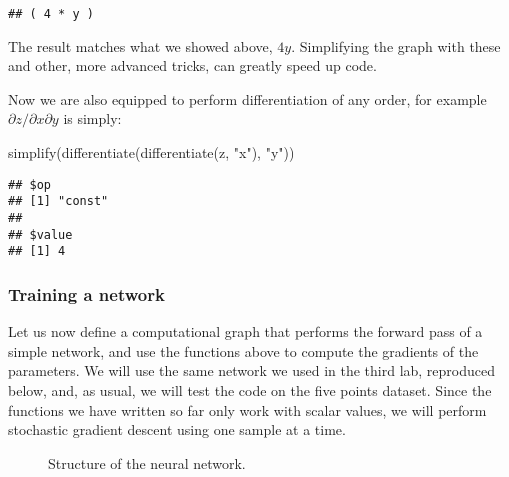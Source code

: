 \documentclass[
  a4paper,
]{article}
\newenvironment{Shaded}{\begin{snugshade}}{\end{snugshade}}
\newcommand{\FunctionTok}[1]{\textcolor[rgb]{0.00,0.00,0.00}{#1}}
\newcommand{\NormalTok}[1]{#1}
\newcommand{\StringTok}[1]{\textcolor[rgb]{0.31,0.60,0.02}{#1}}
\begin{document}
\begin{verbatim}
## ( 4 * y )
\end{verbatim}

The result matches what we showed above, \(4y\). Simplifying the graph
with these and other, more advanced tricks, can greatly speed up code.

Now we are also equipped to perform differentiation of any order, for
example \(\partial z / \partial x\partial y\) is simply:

\begin{Shaded}
\begin{Highlighting}[]
\FunctionTok{simplify}\NormalTok{(}\FunctionTok{differentiate}\NormalTok{(}\FunctionTok{differentiate}\NormalTok{(z, }\StringTok{"x"}\NormalTok{), }\StringTok{"y"}\NormalTok{))}
\end{Highlighting}
\end{Shaded}

\begin{verbatim}
## $op
## [1] "const"
## 
## $value
## [1] 4
\end{verbatim}

\hypertarget{training-a-network}{%
\subsubsection{Training a network}\label{training-a-network}}

Let us now define a computational graph that performs the forward pass
of a simple network, and use the functions above to compute the
gradients of the parameters. We will use the same network we used in the
third lab, reproduced below, and, as usual, we will test the code on the
five points dataset. Since the functions we have written so far only
work with scalar values, we will perform stochastic gradient descent
using one sample at a time.

\begin{figure}
\centering
{}
\caption{Structure of the neural network.}
\label{fig:ex1net}
\end{figure}
\end{document}
